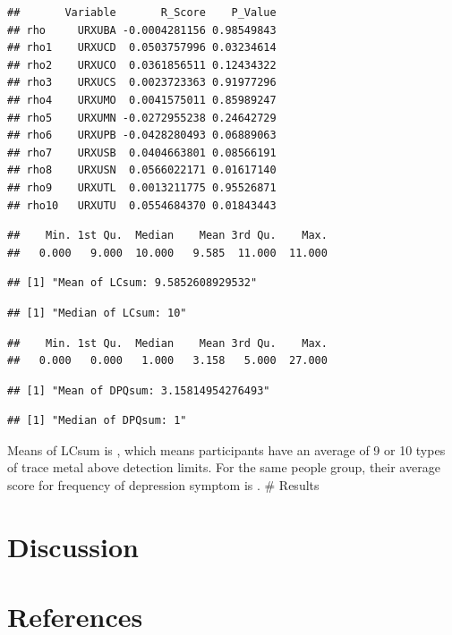 \documentclass[
  man]{apa6}
\begin{document}
\begin{verbatim}
##       Variable       R_Score    P_Value
## rho     URXUBA -0.0004281156 0.98549843
## rho1    URXUCD  0.0503757996 0.03234614
## rho2    URXUCO  0.0361856511 0.12434322
## rho3    URXUCS  0.0023723363 0.91977296
## rho4    URXUMO  0.0041575011 0.85989247
## rho5    URXUMN -0.0272955238 0.24642729
## rho6    URXUPB -0.0428280493 0.06889063
## rho7    URXUSB  0.0404663801 0.08566191
## rho8    URXUSN  0.0566022171 0.01617140
## rho9    URXUTL  0.0013211775 0.95526871
## rho10   URXUTU  0.0554684370 0.01843443
\end{verbatim}

\begin{verbatim}
##    Min. 1st Qu.  Median    Mean 3rd Qu.    Max. 
##   0.000   9.000  10.000   9.585  11.000  11.000
\end{verbatim}

\begin{verbatim}
## [1] "Mean of LCsum: 9.5852608929532"
\end{verbatim}

\begin{verbatim}
## [1] "Median of LCsum: 10"
\end{verbatim}

\begin{verbatim}
##    Min. 1st Qu.  Median    Mean 3rd Qu.    Max. 
##   0.000   0.000   1.000   3.158   5.000  27.000
\end{verbatim}

\begin{verbatim}
## [1] "Mean of DPQsum: 3.15814954276493"
\end{verbatim}

\begin{verbatim}
## [1] "Median of DPQsum: 1"
\end{verbatim}

Means of LCsum is , which means participants have an average of 9 or 10 types of trace metal above detection limits. For the same people group, their average score for frequency of depression symptom is .
\# Results

\hypertarget{discussion}{%
\section{Discussion}\label{discussion}}

\newpage

\hypertarget{references}{%
\section{References}\label{references}}
\end{document}

